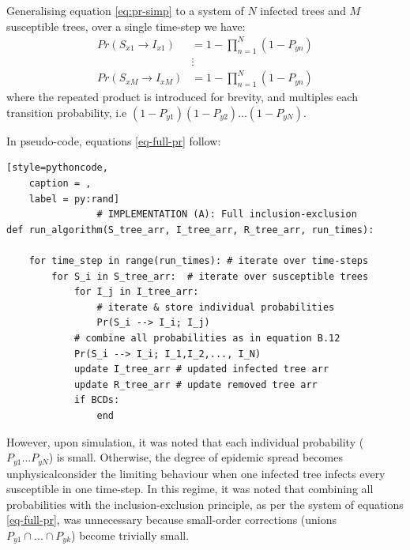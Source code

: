 Generalising equation \ref{eq:pr-simp} to a system of $N$ infected trees and $M$ susceptible trees, over a single time-step we have:
\begin{equation} \label{eq-full-pr}
\begin{split}
Pr(S_{x1} \rightarrow I_{x1}) & = 1 - \prod_{n=1}^{N}(1 - P_{yn})\\
&\vdots \\
Pr(S_{xM} \rightarrow I_{xM}) & = 1 - \prod_{n=1}^{N}(1 - P_{yn})
\end{split}
\end{equation}
where the repeated product is introduced for brevity, and multiples each transition probability, i.e $(1 - P_{y1})(1 - P_{y2})  \hdots (1 - P_{yN})$. 

In pseudo-code, equations \ref{eq-full-pr} follow:
\begin{lstlisting}[style=pythoncode,
    caption = ,
    label = py:rand]
                # IMPLEMENTATION (A): Full inclusion-exclusion
def run_algorithm(S_tree_arr, I_tree_arr, R_tree_arr, run_times):
    
    for time_step in range(run_times): # iterate over time-steps
        for S_i in S_tree_arr:  # iterate over susceptible trees 
            for I_j in I_tree_arr:
                # iterate & store individual probabilities
                Pr(S_i --> I_i; I_j) 
            # combine all probabilities as in equation B.12
            Pr(S_i --> I_i; I_1,I_2,..., I_N)
            update I_tree_arr # updated infected tree arr
            update R_tree_arr # update removed tree arr
            if BCDs:
                end
\end{lstlisting}
However, upon simulation, it was noted that each individual probability ($P_{y1}...P_{yN}$) is small.
Otherwise, the degree of epidemic spread becomes unphysical\textemdash consider the limiting behaviour when one infected tree infects every susceptible in one time-step. 
In this regime, it was noted that combining all probabilities with the inclusion-exclusion principle, as per the system of equations \ref{eq-full-pr}, was unnecessary
because small-order corrections (unions $P_{y1} \cap ... \cap P_{yk}$) become trivially small. 

